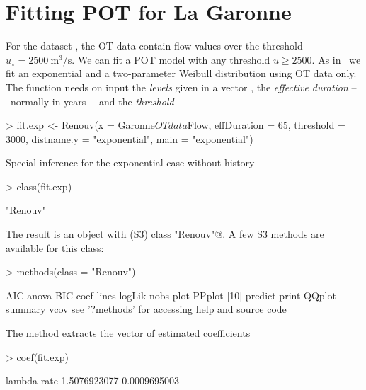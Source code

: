\documentclass[a4paper]{report}
\begin{document}
\section{Fitting POT for La Garonne}
\label{FitGaronne}
For the dataset \verb@Garonne@, the OT data contain flow values over
the threshold $u_\star = 2500~\textrm{m}^3/\textrm{s}$. We can fit a POT
model with any threshold $u \geqslant 2500$. As in~\citet{MIQUELBOOK}
we fit an exponential and a two-parameter Weibull distribution using
OT data only.  The \verb@Renouv@ function needs on input the \textit{levels}
given in a vector \verb@x@, the \textit{effective duration} \verb@effDuration@
--~normally in years~-- and the \textit{threshold}

\begin{Schunk}
\begin{Sinput}
> fit.exp <- Renouv(x = Garonne$OTdata$Flow, effDuration = 65, threshold = 3000,
                    distname.y = "exponential", main = "exponential")
\end{Sinput}
\begin{Soutput}
Special inference for the exponential case without history
\end{Soutput}
\begin{Sinput}
> class(fit.exp)
\end{Sinput}
\begin{Soutput}
[1] "Renouv"
\end{Soutput}
\end{Schunk}

\noindent
The result is an object with (S3) class \verb@"Renouv"@. A few S3 
methods are available for this class:

\begin{Schunk}
\begin{Sinput}
> methods(class = "Renouv")
\end{Sinput}
\begin{Soutput}
 [1] AIC     anova   BIC     coef    lines   logLik  nobs    plot    PPplot 
[10] predict print   QQplot  summary vcov   
see '?methods' for accessing help and source code
\end{Soutput}
\end{Schunk}

\noindent
The method \verb@coef@ extracts the vector of estimated coefficients
\begin{Schunk}
\begin{Sinput}
> coef(fit.exp)
\end{Sinput}
\begin{Soutput}
      lambda         rate 
1.5076923077 0.0009695003 
\end{Soutput}
\end{Schunk}
\end{document}

